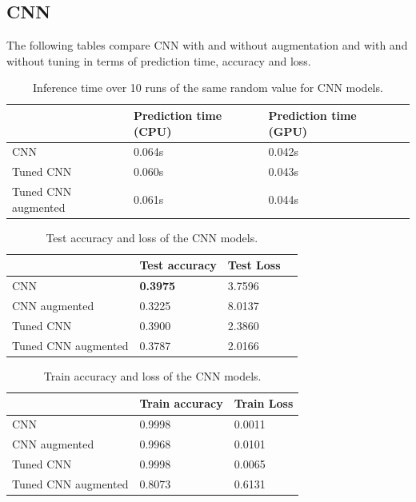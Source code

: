 \pagebreak

\subsection{CNN}
The following tables compare CNN with and without augmentation and with and without tuning in terms of prediction time, accuracy and loss.

\begin{table}[ht]
  \begin{tabular}{|l|l|l|l|}
    \hline
                        & Prediction time (CPU) & Prediction time (GPU) \\ \hline
    CNN                 & 0.064s                & 0.042s                \\ \hline
    Tuned CNN           & 0.060s                & 0.043s                \\ \hline
    Tuned CNN augmented & 0.061s                & 0.044s                \\ \hline
  \end{tabular}
  \caption{Inference time over 10 runs of the same random value for CNN models.}
  \label{table:pred_time}
\end{table}

\begin{table}[ht]
  \centering
  \begin{tabular}{|l|l|l|l|}
    \hline
                        & Test accuracy   & Test Loss \\ \hline
    CNN                 & \textbf{0.3975} & 3.7596    \\ \hline
    CNN augmented       & 0.3225          & 8.0137    \\ \hline
    Tuned CNN           & 0.3900          & 2.3860    \\ \hline
    Tuned CNN augmented & 0.3787          & 2.0166    \\ \hline
  \end{tabular}
  \caption{Test accuracy and loss of the CNN models.}
  \label{table:test_CNN}
\end{table}

\newpage

\begin{table}[ht]
  \centering
  \begin{tabular}{|l|l|l|}
    \hline
                        & Train accuracy & Train Loss \\ \hline
    CNN                 & 0.9998         & 0.0011     \\ \hline
    CNN augmented       & 0.9968         & 0.0101     \\ \hline
    Tuned CNN           & 0.9998         & 0.0065     \\ \hline
    Tuned CNN augmented & 0.8073         & 0.6131     \\ \hline
  \end{tabular}
  \caption{Train accuracy and loss of the CNN models.}
  \label{table:train_CNN}
\end{table}

